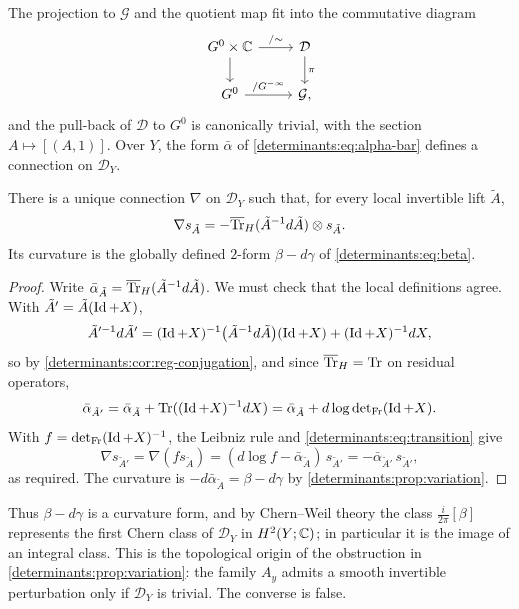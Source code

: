 The projection to $\mathcal G$ and the quotient map fit into the commutative
diagram
\begin{equation*}
  \begin{tikzcd}
    G^0\times\C\arrow[r,"/\sim"]\arrow[d] & \mathcal D\arrow[d,"\pi"]\\
    G^0\arrow[r,"/G^{-\infty}"] & \mathcal G,
  \end{tikzcd}
\end{equation*}
and the pull-back of $\mathcal D$ to $G^0$ is canonically trivial, with the
section $A\mapsto[(A,1)]$. Over $Y$, the form $\bar\alpha$ of
\eqref{determinants:eq:alpha-bar} defines a connection on $\mathcal D_Y$.

\begin{theorem}\label{determinants:thm:connection}
  There is a unique connection $\nabla$ on $\mathcal D_Y$ such that, for every
  local invertible lift $\tilde A$,
  \begin{equation*}
    \nabla s_{\tilde A}=-\overline{\operatorname{Tr}}_{H}(\tilde A^{-1}d\tilde A)\otimes s_{\tilde A}.
  \end{equation*}
  Its curvature is the globally defined $2$-form $\beta-d\gamma$ of
  \eqref{determinants:eq:beta}.
\end{theorem}
\begin{proof}
  Write $\bar\alpha_{\tilde A}=\overline{\operatorname{Tr}}_{H}(\tilde A^{-1}d\tilde A)$. We must check
  that the local definitions agree. With $\tilde A'=\tilde A(\operatorname{Id}+X)$,
  \begin{equation*}
    \tilde A'^{-1}d\tilde A'=(\operatorname{Id}+X)^{-1}\bigl(\tilde A^{-1}d\tilde A\bigr)(\operatorname{Id}+X)+(\operatorname{Id}+X)^{-1}dX,
  \end{equation*}
  so by \cref{determinants:cor:reg-conjugation}, and since $\overline{\operatorname{Tr}}_{H}=\operatorname{Tr}$ on
  residual operators,
  \begin{equation*}
    \bar\alpha_{\tilde A'}=\bar\alpha_{\tilde A}+\operatorname{Tr}((\operatorname{Id}+X)^{-1}dX)=\bar\alpha_{\tilde A}+d\log\operatorname{det}_{\mathrm{Fr}}(\operatorname{Id}+X).
  \end{equation*}
  With $f=\operatorname{det}_{\mathrm{Fr}}(\operatorname{Id}+X)^{-1}$, the Leibniz rule and
  \eqref{determinants:eq:transition} give
  \begin{equation*}
    \nabla s_{\tilde A'}=\nabla(fs_{\tilde A})=(d\log f-\bar\alpha_{\tilde A})\,s_{\tilde A'}=-\bar\alpha_{\tilde A'}\,s_{\tilde A'},
  \end{equation*}
  as required. The curvature is $-d\bar\alpha_{\tilde A}=\beta-d\gamma$ by
  \cref{determinants:prop:variation}.
\end{proof}

Thus $\beta-d\gamma$ is a curvature form, and by Chern--Weil theory the
class $\frac{i}{2\pi}[\beta]$ represents the first Chern class of
$\mathcal D_Y$ in $H^2(Y;\mathbb{C})$; in particular it is the image of an integral
class. This is the topological origin of the obstruction in
\cref{determinants:prop:variation}: the family $A_y$ admits a smooth invertible
perturbation only if $\mathcal D_Y$ is trivial. The converse is false.

